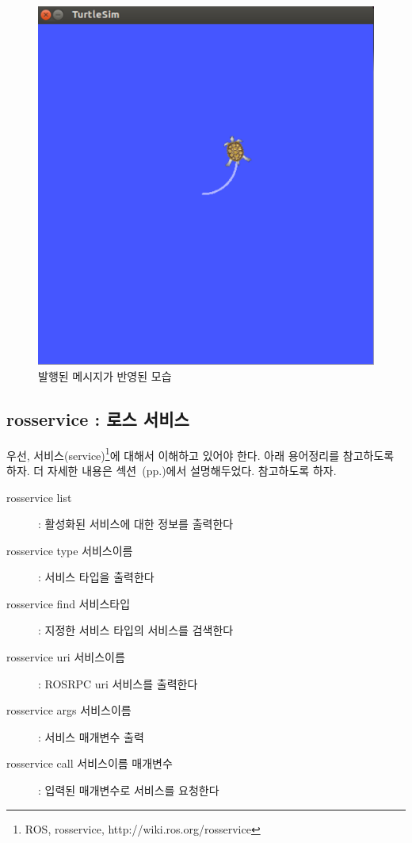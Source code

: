 \begin{figure}[h]
\centering\includegraphics[width=0.7\columnwidth]{pictures/chapter5/rostopic_pub.png}
\caption{발행된 메시지가 반영된 모습}
\end{figure}


\subsection{rosservice : 로스 서비스}

우선, 서비스(service)\footnote{ROS, rosservice, http://wiki.ros.org/rosservice}에 대해서 이해하고 있어야 한다. 아래 용어정리를 참고하도록 하자. 더 자세한 내용은 섹션~(pp.\pageref{def:RosService})에서 설명해두었다. 참고하도록 하자.

\vspace{\baselineskip}
\noindent
\begin{description}
\item[rosservice list] : 활성화된 서비스에 대한 정보를 출력한다
\item[rosservice type 서비스이름] : 서비스 타입을 출력한다
\item[rosservice find 서비스타입] : 지정한 서비스 타입의 서비스를 검색한다
\item[rosservice uri  서비스이름] : ROSRPC uri 서비스를 출력한다
\item[rosservice args 서비스이름] : 서비스 매개변수 출력
\item[rosservice call 서비스이름 매개변수] : 입력된 매개변수로 서비스를 요청한다
\end{description}

